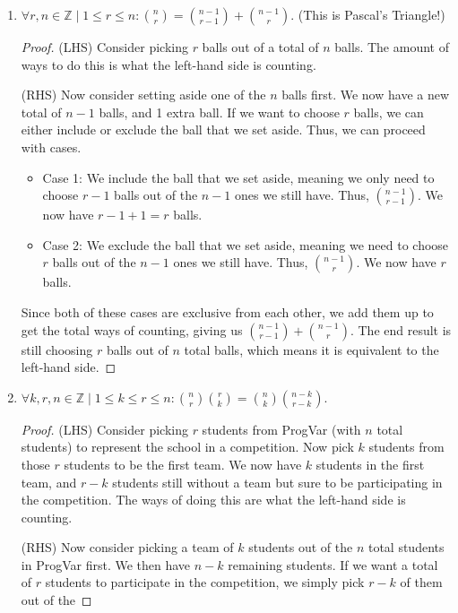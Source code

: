 \documentclass{article}
\begin{document}
\begin{enumerate}
    \item $\displaystyle \forall r,n \in \mathbb{Z} \mid 1 \leq r \leq n: \binom{n}{r} = \binom{n-1}{r-1} + \binom{n-1}{r}$. (This is Pascal's Triangle!)\begin{proof} 
        (LHS) Consider picking $r$ balls out of a total of $n$ balls. The amount of ways to do this is what the left-hand side is counting.\par (RHS) Now consider setting aside one of the $n$ balls first. 
        We now have a new total of $n-1$ balls, and 1 extra ball. If we want to choose $r$ balls, we can either include or exclude the ball that we set aside. Thus, we can proceed with cases.\begin{itemize} 
            \item Case 1: We include the ball that we set aside, meaning we only need to choose $r-1$ balls out of the $n-1$ ones we still have. Thus, $\binom{n-1}{r-1}$. We now have $r-1 +1 = r$ balls. 
            \item Case 2: We exclude the ball that we set aside, meaning we need to choose $r$ balls out of the $n-1$ ones we still have. Thus, $\binom{n-1}{r}$. We now have $r$ balls. 
        \end{itemize} Since both of these cases are exclusive from each other, we add them up to get the total ways of counting, giving us $\binom{n-1}{r-1} + \binom{n-1}{r}$. The end result is still choosing $r$ balls out of $n$ total balls,
        which means it is equivalent to the left-hand side. 
    \end{proof} 
    \item $\displaystyle \forall k,r,n \in \mathbb{Z} \mid 1 \leq k \leq r \leq n : \binom{n}{r} \binom{r}{k} = \binom{n}{k} \binom{n-k}{r-k}$.\begin{proof}
        (LHS) Consider picking $r$ students from ProgVar (with $n$ total students) to represent the school in a competition. Now pick $k$ students from those $r$ students to be the first team. We now have $k$ students in the first team, and $r-k$ students still without a team 
        but sure to be participating in the competition. The ways of doing this are what the left-hand side is counting.\par 
        (RHS) Now consider picking a team of $k$ students out of the $n$ total students in ProgVar first. We then have $n-k$ remaining students. If we want a total of $r$ students to participate in the competition, we simply pick $r-k$ of them out of the 

\end{proof}
\end{enumerate}
\end{document}
